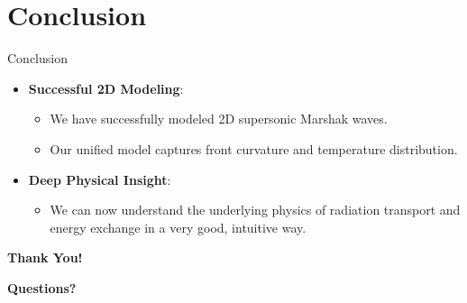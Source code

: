 \documentclass{beamer}
\begin{document}
\section{Conclusion}
\begin{frame}{Conclusion}
    \begin{itemize}
        \item \textbf{Successful 2D Modeling}:
        \begin{itemize}
            \item We have successfully modeled 2D supersonic Marshak waves.
            \item Our unified model captures front curvature and temperature distribution.
        \end{itemize}
        \vspace{0.3cm}
        \item \textbf{Deep Physical Insight}:
        \begin{itemize}
            \item We can now understand the underlying physics of radiation transport and energy exchange in a very good, intuitive way.
        \end{itemize}
    \end{itemize}
\end{frame}

\begin{frame}
    \begin{center}
        \Huge \textbf{Thank You!}
    \end{center}
    \vfill
    \begin{center}
        \Large \textbf{Questions?}
    \end{center}
\end{frame}
\end{document}
